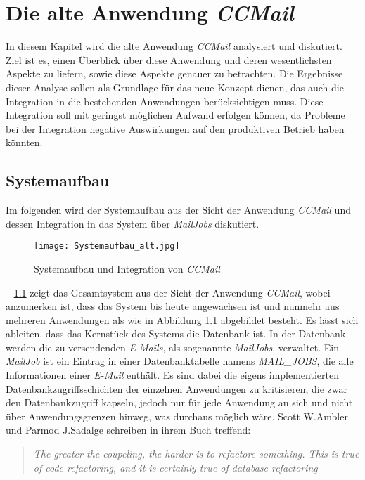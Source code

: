 \chapter{Die alte Anwendung \emph{CCMail}}
\label{cha:ccmail}
In diesem Kapitel wird die alte Anwendung \emph{CCMail} analysiert und diskutiert. Ziel ist es, einen Überblick über diese Anwendung und deren wesentlichsten Aspekte zu liefern, sowie diese Aspekte genauer zu betrachten. Die Ergebnisse dieser Analyse sollen als Grundlage für das neue Konzept dienen, das auch die Integration in die bestehenden Anwendungen berücksichtigen muss. Diese Integration soll mit geringst möglichen Aufwand erfolgen können, da Probleme bei der Integration negative Auswirkungen auf den produktiven Betrieb haben könnten. 

\section{Systemaufbau}
\label{sec:ccmail-systemaufbau}
Im folgenden wird der Systemaufbau aus der Sicht der Anwendung \emph{CCMail} und dessen Integration in das System über \emph{MailJobs} diskutiert. 
\begin{figure}[h]
\centering
\texttt{[image: Systemaufbau\_alt.jpg]} %
\caption{Systemaufbau und Integration von \emph{CCMail}}
\label{fig:ccmail-system-und-integration}
\end{figure}
\ \newpage
{} \ref{fig:ccmail-system-und-integration} zeigt das Gesamtsystem aus der Sicht der Anwendung \emph{CCMail}, wobei anzumerken ist, dass das System bis heute angewachsen ist und nunmehr aus mehreren Anwendungen als wie in Abbildung  \ref{fig:ccmail-system-und-integration} abgebildet besteht. Es lässt sich ableiten, dass das Kernstück des Systems die Datenbank ist. In der Datenbank werden die zu versendenden \emph{E-Mails}, als sogenannte \emph{MailJobs}, verwaltet. Ein \emph{MailJob} ist ein Eintrag in einer Datenbanktabelle namens \emph{MAIL\_JOBS}, die alle Informationen einer \emph{E-Mail} enthält. Es sind dabei die eigens implementierten Datenbankzugriffsschichten der einzelnen Anwendungen zu kritisieren, die zwar den Datenbankzugriff kapseln, jedoch nur für jede Anwendung an sich und nicht über Anwendungsgrenzen hinweg, was durchaus möglich wäre. Scott W.Ambler und Parmod J.Sadalge schreiben in ihrem Buch \cite[27]{refactoreDatabase} treffend:
\begin{quote}
\emph{The greater the coupeling, the harder is to refactore something. This is true of code refactoring, and it is certainly true of database refactoring}
\end{quote}
